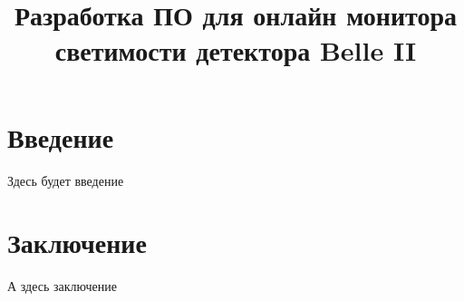\documentclass[a4paper, 12pt]{article}
\title{Разработка ПО для онлайн монитора светимости детектора Belle II}
\begin{document}
\maketitle
\newpage

\section{Введение}
Здесь будет введение

\section{Заключение}
А здесь заключение
\end{document}

